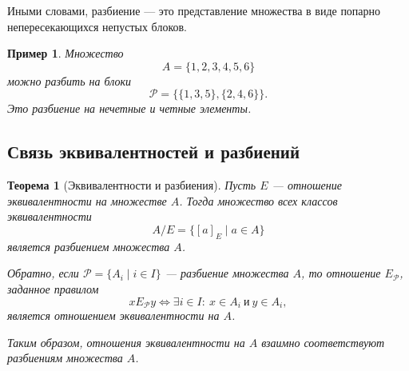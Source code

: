 \documentclass[12pt,a4paper]{article}
\newtheorem{theorem}{Теорема}
\newtheorem{example}{Пример}
\begin{document}
Иными словами, разбиение --- это представление множества в виде попарно непересекающихся непустых блоков.

\begin{example}
Множество
\[
A=\{1,2,3,4,5,6\}
\]
можно разбить на блоки
\[
\mathcal P=\{\{1,3,5\},\{2,4,6\}\}.
\]
Это разбиение на нечетные и четные элементы.
\end{example}

\subsection{Связь эквивалентностей и разбиений}

\begin{theorem}[Эквивалентности и разбиения]
Пусть $E$ --- отношение эквивалентности на множестве $A$.
Тогда множество всех классов эквивалентности
\[
A/E=\{[a]_E\mid a\in A\}
\]
является разбиением множества $A$.

Обратно, если $\mathcal P=\{A_i\mid i\in I\}$ --- разбиение множества $A$, то отношение $E_{\mathcal P}$, заданное правилом
\[
xE_{\mathcal P}y
\iff
\exists i\in I:\ x\in A_i\ \text{и}\ y\in A_i,
\]
является отношением эквивалентности на $A$.

Таким образом, отношения эквивалентности на $A$ взаимно соответствуют разбиениям множества $A$.
\end{theorem}
\end{document}

